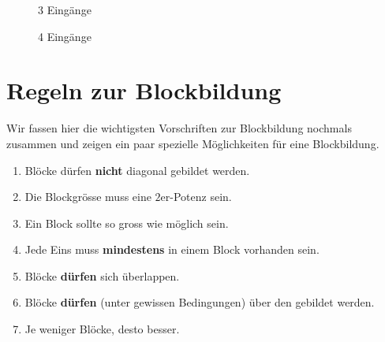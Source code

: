 \begin{figure}[htb]
\begin{minipage}{0.45\textwidth}
\centering
{}
\caption{\num{3} Eingänge}
\label{figure-kv-diagramm-e-3}
\end{minipage}
\hfill
\begin{minipage}{0.45\textwidth}
\centering
{}
\caption{\num{4} Eingänge}
\label{figure-kv-diagramm-e-4}
\end{minipage}
\end{figure}

\newpage

\section{Regeln zur Blockbildung}

Wir fassen hier die wichtigsten Vorschriften zur Blockbildung nochmals zusammen und zeigen ein paar spezielle Möglichkeiten für eine Blockbildung.

\begin{enumerate}
\item Blöcke dürfen \textbf{nicht} diagonal gebildet werden.
\item Die Blockgrösse muss eine $2$er-Potenz sein.
\item Ein Block sollte so gross wie möglich sein.
\item Jede Eins muss \textbf{mindestens} in einem Block vorhanden sein.
\item Blöcke \textbf{dürfen} sich überlappen.
\item Blöcke \textbf{dürfen} (unter gewissen Bedingungen) über den  gebildet werden.
\item Je weniger Blöcke, desto besser.
\end{enumerate}

